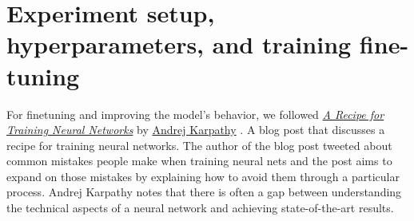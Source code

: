 \section{Experiment setup, hyperparameters, and training fine-tuning}



For finetuning and improving the model's behavior, we followed \href{http://karpathy.github.io/2019/04/25/recipe/}{\textit{A Recipe for Training Neural Networks}} \cite{AndrejKarpathyHttp://karpathy.github.io/2019/04/25/recipe/} by \href{https://karpathy.ai/}{Andrej Karpathy} \cite{AndrejKarpathyHttps://karpathy.ai/}. A blog post that discusses a recipe for training neural networks. The author of the blog post tweeted about common mistakes people make when training neural nets and the post aims to expand on those mistakes by explaining how to avoid them through a particular process. Andrej Karpathy notes that there is often a gap between understanding the technical aspects of a neural network and achieving state-of-the-art results.